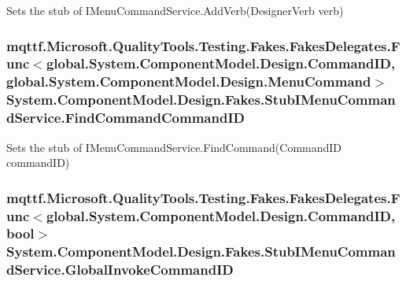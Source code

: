 Sets the stub of I\-Menu\-Command\-Service.\-Add\-Verb(\-Designer\-Verb verb)

\hypertarget{class_system_1_1_component_model_1_1_design_1_1_fakes_1_1_stub_i_menu_command_service_aefc8704d4ce721f1f4cfcf517cf9e899}{
\subsubsection[{Find\-Command\-Command\-I\-D}]{\setlength{\rightskip}{0pt plus 5cm}mqttf.\-Microsoft.\-Quality\-Tools.\-Testing.\-Fakes.\-Fakes\-Delegates.\-Func$<$global.\-System.\-Component\-Model.\-Design.\-Command\-I\-D, global.\-System.\-Component\-Model.\-Design.\-Menu\-Command$>$ System.\-Component\-Model.\-Design.\-Fakes.\-Stub\-I\-Menu\-Command\-Service.\-Find\-Command\-Command\-I\-D}}\label{class_system_1_1_component_model_1_1_design_1_1_fakes_1_1_stub_i_menu_command_service_aefc8704d4ce721f1f4cfcf517cf9e899}


Sets the stub of I\-Menu\-Command\-Service.\-Find\-Command(\-Command\-I\-D command\-I\-D)

\hypertarget{class_system_1_1_component_model_1_1_design_1_1_fakes_1_1_stub_i_menu_command_service_ad835fba4db623a6abdc626cdbdb12b53}{
\subsubsection[{Global\-Invoke\-Command\-I\-D}]{\setlength{\rightskip}{0pt plus 5cm}mqttf.\-Microsoft.\-Quality\-Tools.\-Testing.\-Fakes.\-Fakes\-Delegates.\-Func$<$global.\-System.\-Component\-Model.\-Design.\-Command\-I\-D, bool$>$ System.\-Component\-Model.\-Design.\-Fakes.\-Stub\-I\-Menu\-Command\-Service.\-Global\-Invoke\-Command\-I\-D}}\label{class_system_1_1_component_model_1_1_design_1_1_fakes_1_1_stub_i_menu_command_service_ad835fba4db623a6abdc626cdbdb12b53}


